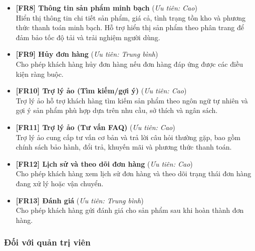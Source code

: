\begin{itemize}
\item \textbf{[FR8] Thông tin sản phẩm minh bạch} \hfill (\textit{Ưu tiên: Cao})\\
    Hiển thị thông tin chi tiết sản phẩm, giá cả, tình trạng tồn kho và phương thức thanh toán minh bạch.
    Hỗ trợ hiển thị sản phẩm theo phân trang để đảm bảo tốc độ tải và trải nghiệm người dùng.

\item \textbf{[FR9] Hủy đơn hàng} \hfill (\textit{Ưu tiên: Trung bình})\\
    Cho phép khách hàng hủy đơn hàng nếu đơn hàng đáp ứng được các điều kiện ràng buộc.

\item \textbf{[FR10] Trợ lý ảo (Tìm kiếm/gợi ý)} \hfill (\textit{Ưu tiên: Cao})\\
    Trợ lý ảo hỗ trợ khách hàng tìm kiếm sản phẩm theo ngôn ngữ tự nhiên và gợi ý sản phẩm phù hợp dựa trên nhu cầu, sở thích và ngân sách.

\item \textbf{[FR11] Trợ lý ảo (Tư vấn FAQ)} \hfill (\textit{Ưu tiên: Cao})\\
    Trợ lý ảo cung cấp tư vấn cơ bản và trả lời câu hỏi thường gặp, bao gồm chính sách bảo hành, đổi trả, khuyến mãi và phương thức thanh toán.

\item \textbf{[FR12] Lịch sử và theo dõi đơn hàng} \hfill (\textit{Ưu tiên: Cao})\\
    Cho phép khách hàng xem lịch sử đơn hàng và theo dõi trạng thái đơn hàng đang xử lý hoặc vận chuyển.

\item \textbf{[FR13] Đánh giá} \hfill (\textit{Ưu tiên: Trung bình})\\
    Cho phép khách hàng gửi đánh giá cho sản phẩm sau khi hoàn thành đơn hàng.

\end{itemize}

\subsubsection{Đối với quản trị viên}

